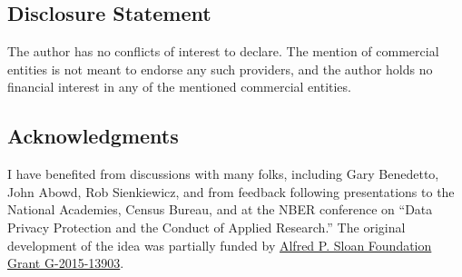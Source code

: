 \documentclass[]{hdsr}
\begin{document}























\subsection*{Disclosure Statement}
The author has no conflicts of interest to declare. The mention of commercial entities is not meant to endorse any such providers, and the author holds no financial interest in any of the mentioned commercial entities.

\subsection*{Acknowledgments}

I have benefited from discussions with many folks, including Gary Benedetto, John Abowd, Rob Sienkiewicz, and from feedback following presentations to the National Academies, Census Bureau, and at the NBER conference on ``Data Privacy Protection and the Conduct of Applied Research.'' The original development of the idea was partially funded by \href{https://sloan.org/grant-detail/6845}{Alfred P. Sloan Foundation Grant G-2015-13903}.
\end{document}
